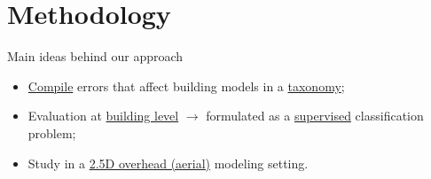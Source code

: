 \documentclass[10pt, export]{beamer}
\begin{document}
    \section{Methodology}
            \begin{frame}{Main ideas behind our approach}
                \begin{itemize}[label=$\blacktriangleright$, font=\color{IGNGreen}, itemsep=2em]
                    \item<1-> \underline{Compile} errors that affect building models in a \underline{taxonomy};
                    \item<2-> Evaluation at \underline{building level} $\longrightarrow$ formulated as a \underline{supervised} classification problem;
                    \item<3-> Study in a \underline{2.5D overhead (aerial)} modeling setting.
                \end{itemize}
            \end{frame}
\end{document}
